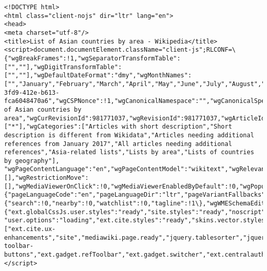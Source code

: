 \documentclass[11pt]{article}
\begin{document}
    \begin{Verbatim}[commandchars=\\\{\}]
<!DOCTYPE html>
<html class="client-nojs" dir="ltr" lang="en">
<head>
<meta charset="utf-8"/>
<title>List of Asian countries by area - Wikipedia</title>
<script>document.documentElement.className="client-js";RLCONF=\{"wgBreakFrames":!1,"wgSeparatorTransformTable":["",""],"wgDigitTransformTable":["",""],"wgDefaultDateFormat":"dmy","wgMonthNames":["","January","February","March","April","May","June","July","August","September","October","November","December"],"wgRequestId":"c4479418-3fd9-412e-b613-fca6048470a6","wgCSPNonce":!1,"wgCanonicalNamespace":"","wgCanonicalSpecialPageName":!1,"wgNamespaceNumber":0,"wgPageName":"List\_of\_Asian\_countries\_by\_area","wgTitle":"List of Asian countries by area","wgCurRevisionId":981771037,"wgRevisionId":981771037,"wgArticleId":47659173,"wgIsArticle":!0,"wgIsRedirect":!1,"wgAction":"view","wgUserName":null,"wgUserGroups":["*"],"wgCategories":["Articles with short description","Short description is different from Wikidata","Articles needing additional references from January 2017","All articles needing additional references","Asia-related lists","Lists by area","Lists of countries by geography"],
"wgPageContentLanguage":"en","wgPageContentModel":"wikitext","wgRelevantPageName":"List\_of\_Asian\_countries\_by\_area","wgRelevantArticleId":47659173,"wgIsProbablyEditable":!0,"wgRelevantPageIsProbablyEditable":!0,"wgRestrictionEdit":[],"wgRestrictionMove":[],"wgMediaViewerOnClick":!0,"wgMediaViewerEnabledByDefault":!0,"wgPopupsReferencePreviews":!1,"wgPopupsConflictsWithNavPopupGadget":!1,"wgVisualEditor":\{"pageLanguageCode":"en","pageLanguageDir":"ltr","pageVariantFallbacks":"en"\},"wgMFDisplayWikibaseDescriptions":\{"search":!0,"nearby":!0,"watchlist":!0,"tagline":!1\},"wgWMESchemaEditAttemptStepOversample":!1,"wgULSCurrentAutonym":"English","wgNoticeProject":"wikipedia","wgCentralAuthMobileDomain":!1,"wgEditSubmitButtonLabelPublish":!0,"wgULSPosition":"interlanguage","wgWikibaseItemId":"Q20983969"\};RLSTATE=\{"ext.globalCssJs.user.styles":"ready","site.styles":"ready","noscript":"ready","user.styles":"ready","ext.globalCssJs.user":"ready","user":"ready",
"user.options":"loading","ext.cite.styles":"ready","skins.vector.styles.legacy":"ready","jquery.tablesorter.styles":"ready","jquery.makeCollapsible.styles":"ready","ext.visualEditor.desktopArticleTarget.noscript":"ready","ext.uls.interlanguage":"ready","ext.wikimediaBadges":"ready","wikibase.client.init":"ready"\};RLPAGEMODULES=["ext.cite.ux-enhancements","site","mediawiki.page.ready","jquery.tablesorter","jquery.makeCollapsible","skins.vector.legacy.js","ext.gadget.ReferenceTooltips","ext.gadget.charinsert","ext.gadget.extra-toolbar-buttons","ext.gadget.refToolbar","ext.gadget.switcher","ext.centralauth.centralautologin","mmv.head","mmv.bootstrap.autostart","ext.popups","ext.visualEditor.desktopArticleTarget.init","ext.visualEditor.targetLoader","ext.eventLogging","ext.wikimediaEvents","ext.navigationTiming","ext.uls.compactlinks","ext.uls.interface","ext.cx.eventlogging.campaigns","ext.quicksurveys.init","ext.centralNotice.geoIP","ext.centralNotice.startUp"];</script>

\end{Verbatim}
\end{document}
